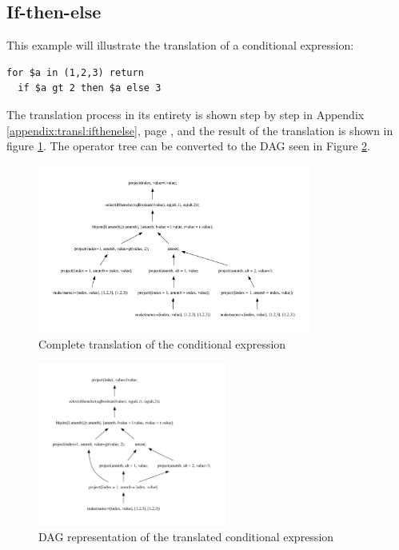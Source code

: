\subsection{If-then-else}
This example will illustrate the translation of a conditional expression:
\begin{Verbatim}
for $a in (1,2,3) return
  if $a gt 2 then $a else 3
\end{Verbatim}
The translation process in its entirety is shown step by step in Appendix \ref{appendix:transl:ifthenelse}, page
\pageref{appendix:transl:ifthenelse}, and the result of the translation is shown in figure
\ref{fig:results:query_ifthenelse_result}. The operator tree can be converted to the DAG seen in Figure
\ref{fig:results:query_ifthenelse_result_dag}.
\begin{figure}[!htp]
\centering
  \includegraphics[width=0.8\textwidth]{img/graphs/ifthenelse}
  \caption{Complete translation of the conditional expression }
  \label{fig:results:query_ifthenelse_result}
\end{figure}

\begin{figure}[!htp]
\centering
  \includegraphics[width=0.55\textwidth]{img/graphs/ifthenelse_dag}
  \caption{DAG representation of the translated conditional expression}
  \label{fig:results:query_ifthenelse_result_dag}
\end{figure}

